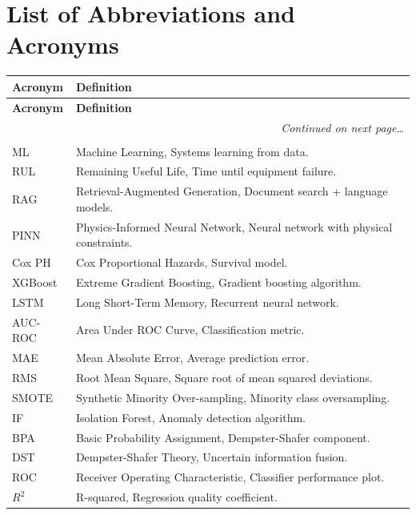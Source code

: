 \chapter{List of Abbreviations and Acronyms}
\label{chap:abbreviations}

\begin{small}
\begin{longtable}{|l|p{9.5cm}|}
\hline
\textbf{Acronym} & \textbf{Definition} \\
\hline
\endfirsthead
\hline
\textbf{Acronym} & \textbf{Definition} \\
\hline
\endhead
\hline
\multicolumn{2}{r}{\textit{Continued on next page\ldots}} \\
\endfoot
\hline
\endlastfoot

\multicolumn{2}{|l|}{\textbf{Machine Learning and Data Science}} \\
\hline
ML & Machine Learning, Systems learning from data. \\
\hline
RUL & Remaining Useful Life, Time until equipment failure. \\
\hline
RAG & Retrieval-Augmented Generation, Document search + language models. \\
\hline
PINN & Physics-Informed Neural Network, Neural network with physical constraints. \\
\hline
Cox PH & Cox Proportional Hazards, Survival model. \\
\hline
XGBoost & Extreme Gradient Boosting, Gradient boosting algorithm. \\
\hline
LSTM & Long Short-Term Memory, Recurrent neural network. \\
\hline
AUC-ROC & Area Under ROC Curve, Classification metric. \\
\hline
MAE & Mean Absolute Error, Average prediction error. \\
\hline
RMS & Root Mean Square, Square root of mean squared deviations. \\
\hline
SMOTE & Synthetic Minority Over-sampling, Minority class oversampling. \\
\hline
IF & Isolation Forest, Anomaly detection algorithm. \\
\hline
BPA & Basic Probability Assignment, Dempster-Shafer component. \\
\hline
DST & Dempster-Shafer Theory, Uncertain information fusion. \\
\hline
ROC & Receiver Operating Characteristic, Classifier performance plot. \\
\hline
$R^2$ & R-squared, Regression quality coefficient. \\
\hline


\end{longtable}
\end{small}

